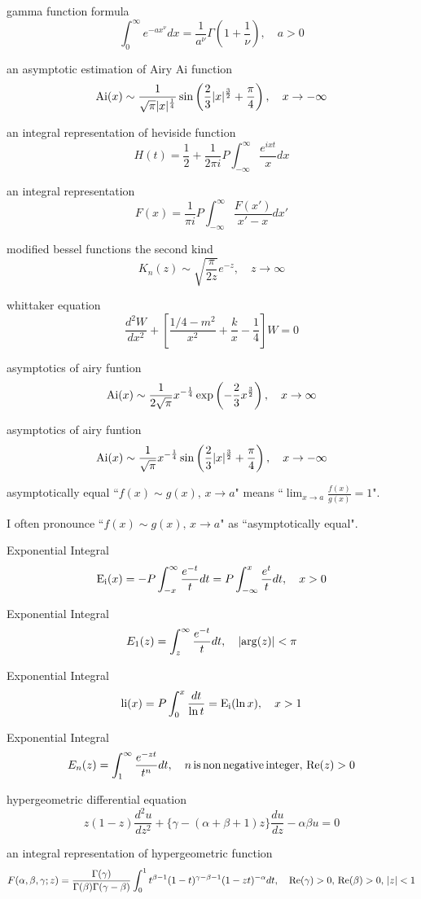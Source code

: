 gamma function formula
$$
\int^\infty_0 e^{-ax^\nu}dx=\frac{1}{a^\nu}\Gamma\left(1+\frac{1}{\nu}\right), \quad a>0
$$

an asymptotic estimation of Airy Ai function
$$
{\rm Ai}(x) \sim \frac{1}{\sqrt{\pi}|x|^{\frac{1}{4}}}\sin\left(\frac{2}{3}|x|^\frac{3}{2}+\frac{\pi}{4}\right), \quad x\rightarrow-\infty
$$

an integral representation of heviside function
$$
H(t)=\frac{1}{2}+\frac{1}{2\pi i}P\int^\infty_{-\infty}\frac{e^{ixt}}{x}dx
$$

an integral representation
$$
F(x)=\frac{1}{\pi i}P\int^\infty_{-\infty}\frac{F(x')}{x'-x}dx'
$$

modified bessel functions the second kind
$$
K_n(z)\sim\sqrt{\frac{\pi}{2z}}e^{-z}, \quad z\rightarrow\infty
$$

whittaker equation
$$
\frac{d^2W}{dx^2}+\left[\frac{1/4-m^2}{x^2}+\frac{k}{x}-\frac{1}{4}\right]W=0
$$

asymptotics of airy funtion
$$
{\rm Ai}(x)\sim \frac{1}{2\sqrt{\pi}}x^{-\frac{1}{4}}\exp\left(-\frac{2}{3}x^{\frac{3}{2}}\right), \quad x\rightarrow\infty
$$

asymptotics of airy funtion
$$
{\rm Ai}(x)\sim \frac{1}{\sqrt{\pi}}x^{-\frac{1}{4}}\sin\left(\frac{2}{3}|x|^{\frac{3}{2}}+\frac{\pi}{4}\right), \quad x\rightarrow-\infty
$$

asymptotically equal
``$f(x)\sim g(x),\,x\rightarrow a$" means ``$\lim_{x\rightarrow a}\frac{f(x)}{g(x)}=1$".

I often pronounce ``$f(x)\sim g(x),\,x\rightarrow a$" as ``asymptotically equal".

Exponential Integral
$$
{\rm E_i}(x)=-P\int^\infty_{-x}\frac{e^{-t}}{t}dt=P\int_{-\infty}^{x}\frac{e^{t}}{t}dt,\quad x>0
$$

Exponential Integral
$$
E_1(z)=\int^\infty_z\frac{e^{-t}}{t}dt,\quad |{\rm arg}(z)|<\pi
$$

Exponential Integral
$$
{\rm li}(x)=P\int^x_0\frac{dt}{\ln t}={\rm E_i}(\ln x),\quad x>1
$$

Exponential Integral
$$
E_n(z)=\int^\infty_1\frac{e^{-zt}}{t^n}dt, \quad n\,{\rm is}\,{\rm non}\, {\rm negative} \,{\rm integer},\,{\rm Re}(z)>0
$$

hypergeometric differential equation
$$
z(1-z)\frac{d^2 u}{dz^2}+\{\gamma-(\alpha+\beta+1)z\}\frac{d u}{dz}-\alpha\beta u=0
$$

an integral representation of hypergeometric function
$$
F(\alpha,\beta,\gamma;z)=\frac{\Gamma(\gamma)}{\Gamma(\beta)\Gamma(\gamma-\beta)}\int^1_0 t^{\beta-1}(1-t)^{\gamma-\beta-1}(1-zt)^{-\alpha}dt, \quad {\rm Re}(\gamma)>0,\,{\rm Re}(\beta)>0,\,|z|<1
$$

